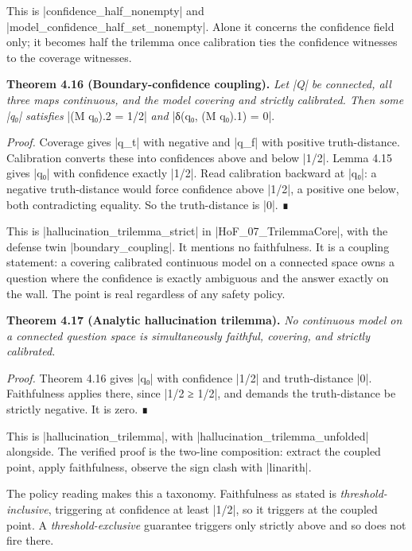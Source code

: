 \documentclass{memoir}
\begin{document}
This is \LeanVerb|confidence_half_nonempty| and \LeanVerb|model_confidence_half_set_nonempty|.
Alone it concerns the confidence field only; it becomes half the trilemma once
calibration ties the confidence witnesses to the coverage witnesses.

\textbf{Theorem 4.16 (Boundary-confidence coupling).} \emph{Let \LeanVerb|Q| be connected, all three maps
continuous, and the model covering and strictly calibrated. Then some \LeanVerb|q₀|
satisfies} \LeanVerb|(M q₀).2 = 1/2| \emph{and} \LeanVerb|δ(q₀, (M q₀).1) = 0|.

\emph{Proof.} Coverage gives \LeanVerb|q_t| with negative and \LeanVerb|q_f| with positive truth-distance.
Calibration converts these into confidences above and below \LeanVerb|1/2|. Lemma 4.15
gives \LeanVerb|q₀| with confidence exactly \LeanVerb|1/2|. Read calibration backward at \LeanVerb|q₀|: a
negative truth-distance would force confidence above \LeanVerb|1/2|, a positive one
below, both contradicting equality. So the truth-distance is \LeanVerb|0|. ∎

This is \LeanVerb|hallucination_trilemma_strict| in \LeanVerb|HoF_07_TrilemmaCore|, with the
defense twin \LeanVerb|boundary_coupling|. It mentions no faithfulness. It is a coupling
statement: a covering calibrated continuous model on a connected space owns a
question where the confidence is exactly ambiguous and the answer exactly on the
wall. The point is real regardless of any safety policy.

\textbf{Theorem 4.17 (Analytic hallucination trilemma).} \emph{No continuous model on a connected
question space is simultaneously faithful, covering, and strictly calibrated.}

\emph{Proof.} Theorem 4.16 gives \LeanVerb|q₀| with confidence \LeanVerb|1/2| and truth-distance \LeanVerb|0|.
Faithfulness applies there, since \LeanVerb|1/2 ≥ 1/2|, and demands the truth-distance be
strictly negative. It is zero. ∎

This is \LeanVerb|hallucination_trilemma|, with \LeanVerb|hallucination_trilemma_unfolded|
alongside. The verified proof is the two-line composition: extract the coupled
point, apply faithfulness, observe the sign clash with \LeanVerb|linarith|.

The policy reading makes this a taxonomy. Faithfulness as stated is
\emph{threshold-inclusive}, triggering at confidence at least \LeanVerb|1/2|, so it triggers
at the coupled point. A \emph{threshold-exclusive} guarantee triggers only strictly
above and so does not fire there.
\end{document}
